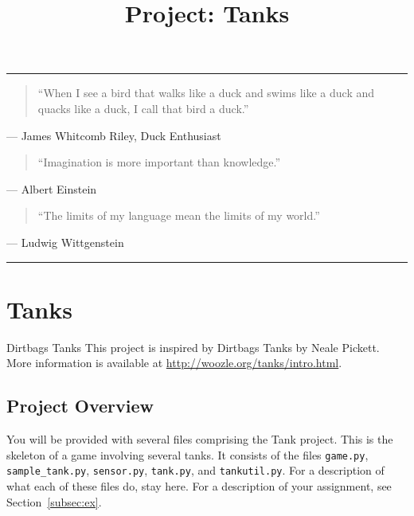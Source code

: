 \documentclass[11pt]{cselabheader}
\title{Project: Tanks}
\begin{document}
\maketitle

\hrule

\begin{quotation}
  ``When I see a bird that walks like a duck and swims like a duck and quacks like
  a duck, I call that bird a duck.''
\end{quotation}
\begin{flushright}
  --- James Whitcomb Riley, Duck Enthusiast
\end{flushright}



\begin{quotation}
``Imagination is more important than knowledge.''
\end{quotation}
\begin{flushright}
  --- Albert Einstein
\end{flushright}

\begin{quotation}
``The limits of my language mean the limits of my world.''
\end{quotation}
\begin{flushright}
  --- Ludwig Wittgenstein
\end{flushright}

\hrule


\section{Tanks}

\begin{warningbox}{Dirtbags Tanks}
  This project is inspired by Dirtbags Tanks by Neale Pickett.
  More information is available at \url{http://woozle.org/tanks/intro.html}.
\end{warningbox}

\subsection{Project Overview}
You will be provided with several files comprising the Tank project. This is the
skeleton of a game involving several tanks. It consists of the files
\texttt{game.py}, \texttt{sample\_tank.py}, \texttt{sensor.py},
\texttt{tank.py}, and \texttt{tankutil.py}. For a description of what each of
these files do, stay here. For a description of your assignment, see
Section~\ref{subsec:ex}.
\end{document}

